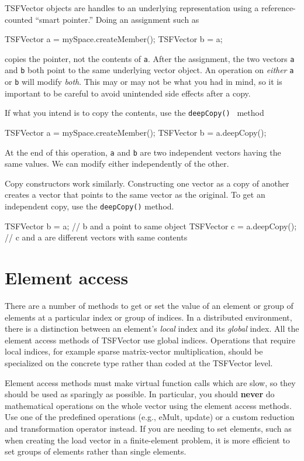 TSFVector objects are handles to an underlying representation using a reference-counted
``smart pointer.''
Doing an assignment such as
\begin{code}
TSFVector a = mySpace.createMember();
TSFVector b = a;
\end{code}
copies the pointer, not the contents of {\tt a}. After the assignment, the two vectors
{\tt a} and {\tt b} both point to the same underlying vector object. An operation
on {\it either} {\tt a} or {\tt b} will modify {\it both}. 
This may or may not be what you had in mind, so it is important to be careful to avoid
unintended side effects after a copy.

If what you intend is to copy the contents, use the {\tt deepCopy() }
method 
\begin{code}
TSFVector a = mySpace.createMember();
TSFVector b = a.deepCopy();
\end{code}
At the end of this operation, {\tt a} and {\tt b} are two independent vectors having
the same values. We can modify either independently of the other. 

Copy constructors work similarly. Constructing one vector as a copy of another
creates a vector that points to the same vector as the original. To get an independent
copy, use the {\tt deepCopy()} method.

\begin{code}
TSFVector b = a;                    // b and a point to same object
TSFVector c = a.deepCopy();         // c and a are different vectors with same contents 
\end{code}


\section{Element access}

There are a number of methods to get or set the value of an element or
group of elements at a particular index or group of indices. In a
distributed environment, there is a distinction between an element's
{\it local} index and its {\it global} index. All the element access
methods of TSFVector use global indices. Operations that require local indices,
for example sparse matrix-vector multiplication, should be specialized on the concrete
type rather than coded at the TSFVector level.

Element access methods must make virtual function calls which are slow, so they
should be used as sparingly as possible. In particular, you should
{\bf never} do mathematical operations on the whole vector using the
element access methods. Use one of the predefined operations (e.g.,
eMult, update) or a custom reduction and transformation operator
instead. If you are needing to set elements, such as when creating the
load vector in a finite-element problem, it is more efficient to set
groups of elements rather than single elements.

